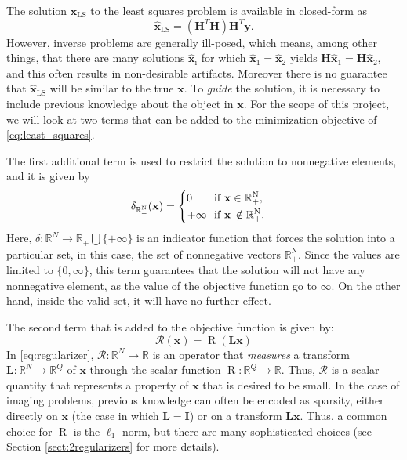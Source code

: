 The solution $\mathbf{\hat{x}}_\mathrm{LS}$ to the least squares problem is available in closed-form as
\begin{equation}
    \mathbf{\hat{x}}_\mathrm{LS} = (\mathbf{H}^T\mathbf{H})\mathbf{H}^T\mathbf{y}\mathrm{.}
    \label{eq:least_squares_solution}
\end{equation}
However, inverse problems are generally ill-posed, which means, among other things, that there are many solutions  $\mathbf{\hat{\mathbf{x}}}_\mathrm{i}$ for which $\mathbf{\hat{\mathbf{x}}}_1 = \mathbf{\hat{x}}_2$ yields $\mathbf{H}\mathbf{\hat{x}}_1 = \mathbf{H}\mathbf{\hat{x}}_2$, and this often results in non-desirable artifacts. Moreover there is no guarantee that $\mathbf{\hat{x}}_\mathrm{LS}$ will be similar to the true $\mathbf{x}$. To \textit{guide} the solution, it is necessary to include previous knowledge about the object in  $\mathbf{x}$. For the scope of this project, we will look at two terms that can be added to the minimization objective of \eqref{eq:least_squares}. 

The first additional term is used to restrict the solution to nonnegative elements, and it is given by
\begin{equation}
    \delta_{\rm \mathbb{R}_+^N}(\mathbf{x}) =
    \begin{cases}
        \begin{split}
        0\qquad \mbox{if } &\mathbf{x} \in \rm \mathbb{R}_+^N\mathrm{,} \\
        + \infty \ \mbox{   if } &\mathbf{x}\, \notin \rm \mathbb{R}_+^N\mathrm{.}
        \end{split}
     \end{cases}
    \label{eq:indicator_function}
\end{equation}
Here, $\delta: \mathbb{R}^N \rightarrow \mathbb{R}_+ \bigcup \{+\infty\}$ is an indicator function that forces the solution into a particular set, in this case, the set of nonnegative vectors $\mathbb{R}_+^\mathrm{N}$. Since the values are limited to $\{0, \infty\}$, this term guarantees that the solution will not have any nonnegative element, as the value of the objective function go to $\infty$. On the other hand, inside the valid set, it will have no further effect. 

The second term that is added to the objective function is given by:
\begin{equation}
        \mathcal{R}(\mathbf{x}) = \operatorname{R}(\mathbf{Lx})
    \label{eq:regularizer}
\end{equation}
In  \eqref{eq:regularizer}, $\mathcal{R}: \mathbb{R}^N \rightarrow \mathbb{R}$ is an operator that \textit{measures} a transform $\mathbf{L}: \mathbb{R}^N \rightarrow \mathbb{R}^Q$ of $\mathbf{x}$ through the scalar function $\operatorname{R}: \mathbb{R}^Q \rightarrow \mathbb{R}$. Thus, $\mathcal{R}$ is a scalar quantity that represents a property of $\mathbf{x}$ that is desired to be small. In the case of imaging problems, previous knowledge can often be encoded as sparsity, either directly on $\mathbf{x}$ (the case in which $\mathbf{L} = \mathbf{I}$) or on a transform $\mathbf{Lx}$. Thus, a common choice for $\operatorname{R}$ is the $\ell_1$ norm, but there are many sophisticated choices (see Section \ref{sect:2regularizers} for more details). 

